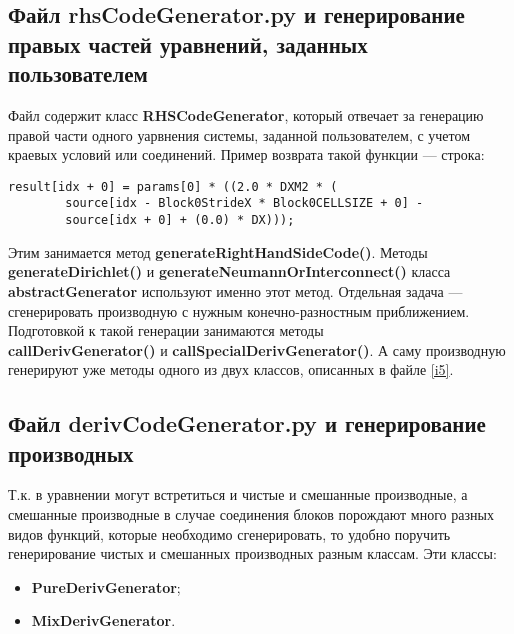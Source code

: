 \documentclass[a4paper]{article}
\begin{document}
\subsection{\Large Файл rhsCodeGenerator.py и генерирование правых частей уравнений, заданных пользователем}
Файл содержит класс {\bf RHSCodeGenerator}, который отвечает за ге\-не\-ра\-цию правой части одного уарвнения системы, заданной пользователем, с учетом краевых условий или соединений. Пример возврата такой функ\-ции --- строка:
\begin{verbatim}
result[idx + 0] = params[0] * ((2.0 * DXM2 * (
        source[idx - Block0StrideX * Block0CELLSIZE + 0] - 
        source[idx + 0] + (0.0) * DX)));
\end{verbatim}

Этим занимается метод {\bf generateRightHandSideCode()}. Методы\\{\bf generateDirichlet()} и {\bf generateNeumannOrInterconnect()} класса\\
{\bf abstractGenerator} используют именно этот метод. Отдельная задача --- сгенерировать производную с нужным конечно-разностным при\-бли\-же\-ни\-ем. Подготовкой к такой генерации занимаются методы \\ {\bf callDerivGenerator()} и {\bf callSpecialDerivGenerator()}. А саму про\-из\-вод\-ную генерируют уже методы одного из двух классов, описанных в файле \ref{i5}.

\subsection{\Large Файл derivCodeGenerator.py и генерирование производных}
Т.к. в уравнении могут встретиться и чистые и смешанные производные, а смешанные производные в случае соединения блоков порождают много разных видов функций, которые необходимо сгенерировать, то удобно поручить генерирование чистых и смешанных производных разным клас\-сам. Эти классы:
\begin{itemize}
\item {\bf PureDerivGenerator};
\item {\bf MixDerivGenerator}.
\end{itemize}
\end{document}
